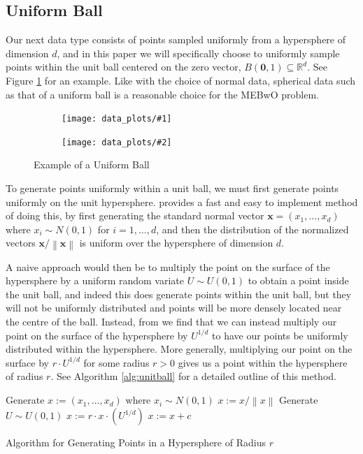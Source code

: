 \documentclass[11pt,twoside]{report}
\newcommand{\norm}[1]{\left\lVert#1\right\rVert} %
\newcommand{\datafigure}[4]{
    \begin{figure}
    \centering
    \begin{subfigure}[b]{0.3333\textwidth}
        \centering
        \texttt{[image: data\_plots/\#1]}
    \end{subfigure}
    \begin{subfigure}[b]{0.3333\textwidth}
        \centering
        \texttt{[image: data\_plots/\#2]}
    \end{subfigure}
    \hfill
    \caption{#3}
    \label{#4}
\end{figure}
}
\theoremstyle{definition}
\numberwithin{theorem}{section}
\numberwithin{definition}{section}
\numberwithin{lemma}{section}
\numberwithin{proposition}{section}
\numberwithin{equation}{section}
\numberwithin{figure}{section}
\begin{document}
\subsection{Uniform Ball}\label{uniform ball}
Our next data type consists of points sampled uniformly from a hypersphere of dimension $d$, and in this paper we will specifically choose to uniformly sample points within the unit ball centered on the zero vector, $B(\mathbf{0},1)\subseteq\mathbb{R}^d$. See Figure \ref{fig:unifball} for an example. Like with the choice of normal data, spherical data such as that of a uniform ball is a reasonable choice for the MEBwO problem.

\datafigure{uniform_ball_2d.png}{uniform_ball_3d.png}{Example of a Uniform Ball}{fig:unifball}

To generate points uniformly within a unit ball, we must first generate points uniformly on the unit hypersphere. \cite{hyperspheresurface} provides a fast and easy to implement method of doing this, by first generating the standard normal vector $\mathbf{x}=(x_1,\ldots,x_d)$ where $x_i\sim N(0,1)$ for $i=1,\ldots,d$, and then the distribution of the normalized vectors $\mathbf{x}/\norm{\mathbf{x}}$ is uniform over the hypersphere of dimension $d$.

A naive approach would then be to multiply the point on the surface of the hypersphere by a uniform random variate $U\sim U(0,1)$ to obtain a point inside the unit ball, and indeed this does generate points within the unit ball, but they will not be uniformly distributed and points will be more densely located near the centre of the ball. Instead, from \cite{eldredge} we find that we can instead multiply our point on the surface of the hypersphere by $U^{1/d}$ to have our points be uniformly distributed within the hypersphere. More generally, multiplying our point on the surface by $r\cdot U^{1/d}$ for some radius $r>0$ gives us a point within the hypersphere of radius $r$. See Algorithm \ref{alg:unitball} for a detailed outline of this method.

\begin{algorithm}[H]
    Generate $x:=(x_1,\ldots,x_d)$ where $x_i\sim N(0,1)$\;
    $x:=x/\norm{x}$\;
    Generate $U\sim U(0,1)$\;
    $x:=r\cdot x\cdot \left(U^{1/d}\right)$\;
    $x:= x+c$\;
    
    \caption{Algorithm for Generating Points in a Hypersphere of Radius $r$}
    \label{alg:unitball}
\end{algorithm}
\end{document}
